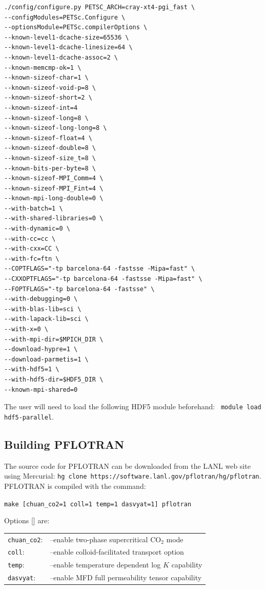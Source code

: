 \documentclass[12pt]{article}
\begin{document}
\footnotesize
\begin{verbatim}
./config/configure.py PETSC_ARCH=cray-xt4-pgi_fast \
--configModules=PETSc.Configure \
--optionsModule=PETSc.compilerOptions \
--known-level1-dcache-size=65536 \
--known-level1-dcache-linesize=64 \
--known-level1-dcache-assoc=2 \
--known-memcmp-ok=1 \
--known-sizeof-char=1 \
--known-sizeof-void-p=8 \
--known-sizeof-short=2 \
--known-sizeof-int=4
--known-sizeof-long=8 \
--known-sizeof-long-long=8 \
--known-sizeof-float=4 \
--known-sizeof-double=8 \
--known-sizeof-size_t=8 \
--known-bits-per-byte=8 \
--known-sizeof-MPI_Comm=4 \
--known-sizeof-MPI_Fint=4 \
--known-mpi-long-double=0 \
--with-batch=1 \
--with-shared-libraries=0 \
--with-dynamic=0 \
--with-cc=cc \
--with-cxx=CC \
--with-fc=ftn \
--COPTFLAGS="-tp barcelona-64 -fastsse -Mipa=fast" \
--CXXOPTFLAGS="-tp barcelona-64 -fastsse -Mipa=fast" \
--FOPTFLAGS="-tp barcelona-64 -fastsse" \
--with-debugging=0 \
--with-blas-lib=sci \
--with-lapack-lib=sci \
--with-x=0 \
--with-mpi-dir=$MPICH_DIR \
--download-hypre=1 \
--download-parmetis=1 \
--with-hdf5=1 \
--with-hdf5-dir=$HDF5_DIR \
--known-mpi-shared=0
\end{verbatim}
\normalsize
The user will need to load the following HDF5 module beforehand: \ \verb|module load hdf5-parallel|.

\subsection{Building PFLOTRAN}

The source code for PFLOTRAN can be downloaded from the LANL web site using Mercurial: \verb|hg clone https://software.lanl.gov/pflotran/hg/pflotran|. PFLOTRAN is compiled with the command:

\verb|make [chuan_co2=1 coll=1 temp=1 dasvyat=1] pflotran|

\noindent
Options [] are: 

\begin{tabular}{ll}
\verb|chuan_co2|: & --enable two-phase supercritical CO$_2$ mode\\
\verb|coll|: & --enable colloid-facilitated transport option\\
\verb|temp|: & --enable temperature dependent log $K$ capability\\
\verb|dasvyat|: & --enable MFD full permeability tensor capability
\end{tabular}
\end{document}
